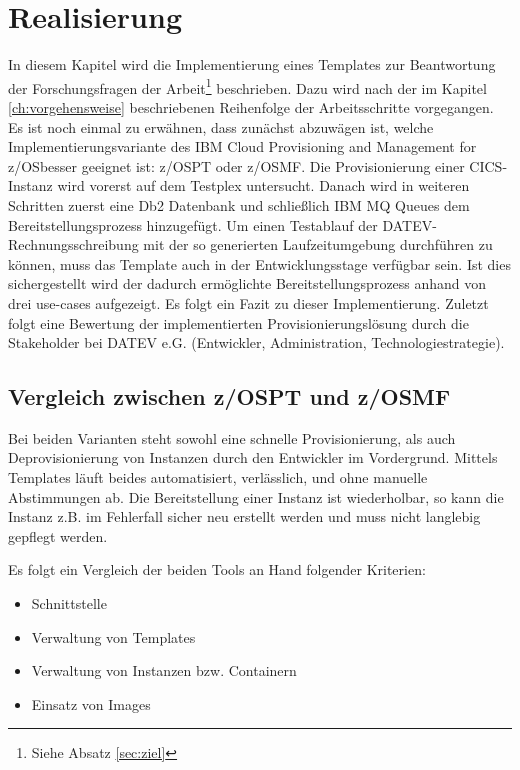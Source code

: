 \chapter{Realisierung}\label{ch:realisierung}
In diesem Kapitel wird die Implementierung eines Templates zur Beantwortung der Forschungsfragen der Arbeit\footnote{Siehe Absatz \ref{sec:ziel}} beschrieben.
Dazu wird nach der im Kapitel \ref{ch:vorgehensweise} beschriebenen Reihenfolge der Arbeitsschritte vorgegangen.
Es ist noch einmal zu erwähnen, dass zunächst abzuwägen ist, welche Implementierungsvariante des \glqq IBM Cloud Provisioning and Management for z/OS\grqq besser geeignet ist: z/OSPT oder z/OSMF.
Die Provisionierung einer CICS-Instanz wird vorerst auf dem Testplex untersucht.
Danach wird in weiteren Schritten zuerst eine Db2 Datenbank und schließlich IBM MQ Queues dem Bereitstellungsprozess hinzugefügt.
Um einen Testablauf der DATEV-Rechnungsschreibung mit der so generierten Laufzeitumgebung durchführen zu können, muss das Template auch in der Entwicklungsstage verfügbar sein.
Ist dies sichergestellt wird der dadurch ermöglichte Bereitstellungsprozess anhand von drei use-cases aufgezeigt.
Es folgt ein Fazit zu dieser Implementierung.
Zuletzt folgt eine Bewertung der implementierten Provisionierungslösung durch die Stakeholder bei DATEV e.G. (Entwickler, Administration, Technologiestrategie).

\section{Vergleich zwischen z/OSPT und z/OSMF}
Bei beiden Varianten steht sowohl eine schnelle Provisionierung, als auch Deprovisionierung von Instanzen durch den Entwickler im Vordergrund.
Mittels Templates läuft beides automatisiert, verlässlich, und ohne manuelle Abstimmungen ab.
Die Bereitstellung einer Instanz ist wiederholbar, so kann die Instanz z.B. im Fehlerfall sicher neu erstellt werden und muss nicht langlebig gepflegt werden. 

Es folgt ein Vergleich der beiden Tools an Hand folgender Kriterien:
\begin{samepage}
\begin{itemize}
\item Schnittstelle
\item Verwaltung von Templates
\item Verwaltung von Instanzen bzw. Containern
\item Einsatz von Images
\end{itemize}
\end{samepage}

